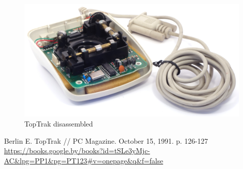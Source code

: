 \documentclass[11pt, a4paper]{article}
\begin{document}
\begin{figure}[h]
    \centering
    \includegraphics[scale=0.7]{1990_kraft_toptrack/inside_60.jpg}
    \caption{TopTrak disassembled}
    \label{fig:TopTrakInside}
\end{figure}

\begin{thebibliography}{9}
 Berlin E. TopTrak // PC Magazine. October 15, 1991. p. 126-127 \url{https://books.google.by/books?id=tSLe3yMjc-AC&lpg=PP1&pg=PT123#v=onepage&q&f=false}
\end{thebibliography}
\end{document}
